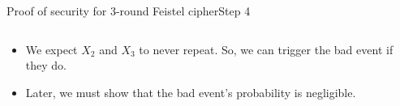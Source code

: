 \documentclass[aspectratio=169, lualatex, handout]{beamer}
\begin{document}
\begin{frame}{Proof of security for 3-round Feistel cipher}{Step 4}
	\begin{columns}[c]
		\begin{column}{0.5\textwidth}
			\begin{itemize}[<+->]
				\item We expect $X_2$ and $X_3$ to never repeat. So, we can trigger the bad event if they do.
				\item Later, we must show that the bad event's probability is negligible.
			\end{itemize}
		\end{column}
		\begin{column}{0.5\textwidth}
			\vspace{-1.5cm}
			\begin{center}
			\end{center}
		\end{column}
	\end{columns}
\end{frame}
\end{document}
